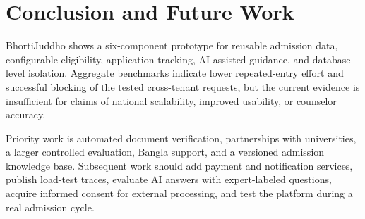 \documentclass[conference,letterpaper]{IEEEtran}
\begin{document}
\section{Conclusion and Future Work}
BhortiJuddho shows a six-component prototype for reusable admission data, configurable eligibility, application tracking, AI-assisted guidance, and database-level isolation. Aggregate benchmarks indicate lower repeated-entry effort and successful blocking of the tested cross-tenant requests, but the current evidence is insufficient for claims of national scalability, improved usability, or counselor accuracy.

Priority work is automated document verification, partnerships with universities, a larger controlled evaluation, Bangla support, and a versioned admission knowledge base. Subsequent work should add payment and notification services, publish load-test traces, evaluate AI answers with expert-labeled questions, acquire informed consent for external processing, and test the platform during a real admission cycle.
\end{document}
